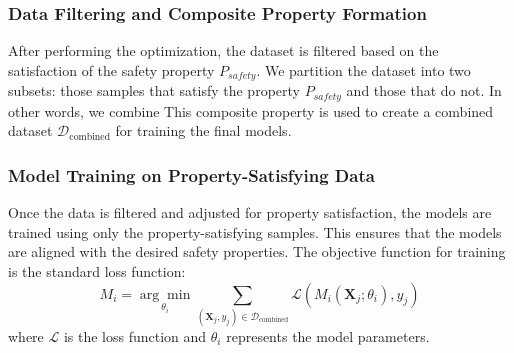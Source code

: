 



\subsubsection{Data Filtering and Composite Property Formation}
After performing the optimization, the dataset is filtered based on the satisfaction of the safety property \( P_{safety} \). We partition the dataset into two subsets: those samples that satisfy the property \( P_{safety} \) and those that do not. In other words, we combine This composite property is used to create a combined dataset \( \mathcal{D}_{\text{combined}} \) for training the final models.

\subsubsection{Model Training on Property-Satisfying Data}
Once the data is filtered and adjusted for property satisfaction, the models are trained using only the property-satisfying samples. This ensures that the models are aligned with the desired safety properties. The objective function for training is the standard loss function:
\[
M_i = \underset{\theta_i}{\arg\min} \sum_{(\mathbf{X}_j, y_j) \in \mathcal{D}_{\text{combined}}} \mathcal{L}(M_i(\mathbf{X}_j; \theta_i), y_j)
\]
where \( \mathcal{L} \) is the loss function and \( \theta_i \) represents the model parameters.

